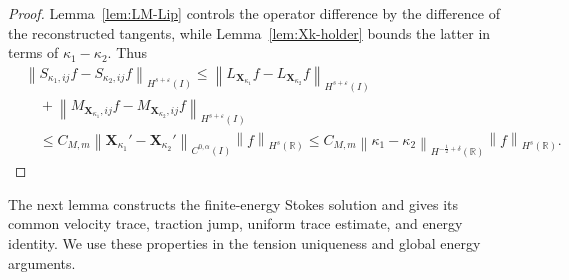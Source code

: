 \documentclass[11pt,reqno]{amsart}
\theoremstyle{plain}
\theoremstyle{definition}
\numberwithin{equation}{section}
\newcommand{\bm}[1]{\boldsymbol{#1}}
\newcommand{\abs}[1]{\left\lvert #1 \right\rvert}
\newcommand{\norm}[1]{\left\lVert #1 \right\rVert}
\newcommand{\R}{\mathbb{R}}
\newcommand{\xka}[1]{\bm X_{\kappa_{#1}}}
\newcommand{\ci}[1]{C^{#1}(I)}
\newcommand{\hi}[1]{H^{#1}(I)}
\newcommand{\hr}[1]{H^{#1}(\R)}
\begin{document}
\begin{proof}
Lemma~\ref{lem:LM-Lip} controls the operator difference by the difference of
the reconstructed tangents, while Lemma~\ref{lem:Xk-holder} bounds the latter
in terms of $\kappa_1-\kappa_2$. Thus
\begin{equation}
\begin{aligned}
    &\norm{S_{\kappa_1,ij}f-S_{\kappa_2,ij}f} _{\hi{s+\varepsilon}} \le \norm{L_{\bm X_{\kappa_1}}f-L_{\bm X_{\kappa_2}}f} _{\hi{s+\varepsilon}} \\
    &\quad+ \norm{M_{\bm X_{\kappa_1},ij}f -M_{\bm X_{\kappa_2},ij}f}_{\hi{s+\varepsilon}} \\
    &\quad\le C_{M,m} \norm{\bm X_{\kappa_1}'-\bm X_{\kappa_2}'}_{\ci{0,\alpha}} \norm{f}_{\hr{s}} \le C_{M,m}
    \norm{\kappa_1-\kappa_2}_{\hr{-\frac12+\delta}} \norm{f}_{\hr{s}}.
\end{aligned}
\end{equation}
\end{proof}

The next lemma constructs the finite-energy Stokes solution and gives its
common velocity trace, traction jump, uniform trace estimate, and energy
identity. We use these properties in the tension uniqueness and global
energy arguments.
\end{document}

